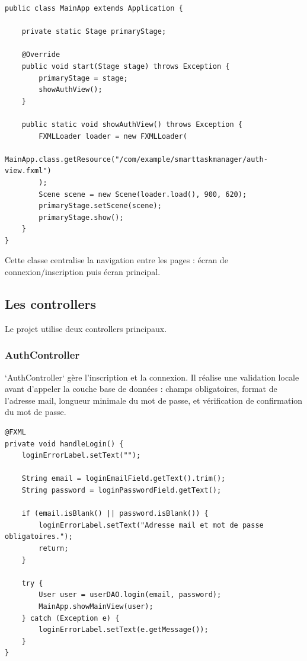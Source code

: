 \documentclass[11pt,a4paper]{article}
\begin{document}
\begin{lstlisting}[style=javaStyle,caption={Rôle principal de MainApp}]
public class MainApp extends Application {

    private static Stage primaryStage;

    @Override
    public void start(Stage stage) throws Exception {
        primaryStage = stage;
        showAuthView();
    }

    public static void showAuthView() throws Exception {
        FXMLLoader loader = new FXMLLoader(
                MainApp.class.getResource("/com/example/smarttaskmanager/auth-view.fxml")
        );
        Scene scene = new Scene(loader.load(), 900, 620);
        primaryStage.setScene(scene);
        primaryStage.show();
    }
}
\end{lstlisting}

Cette classe centralise la navigation entre les pages : écran de connexion/inscription puis écran principal.

\subsection{Les controllers}

Le projet utilise deux controllers principaux.

\subsubsection{AuthController}

`AuthController` gère l'inscription et la connexion. Il réalise une validation locale avant d'appeler la couche base de données : champs obligatoires, format de l'adresse mail, longueur minimale du mot de passe, et vérification de confirmation du mot de passe.

\begin{lstlisting}[style=javaStyle,caption={Validation et connexion dans AuthController}]
@FXML
private void handleLogin() {
    loginErrorLabel.setText("");

    String email = loginEmailField.getText().trim();
    String password = loginPasswordField.getText();

    if (email.isBlank() || password.isBlank()) {
        loginErrorLabel.setText("Adresse mail et mot de passe obligatoires.");
        return;
    }

    try {
        User user = userDAO.login(email, password);
        MainApp.showMainView(user);
    } catch (Exception e) {
        loginErrorLabel.setText(e.getMessage());
    }
}
\end{lstlisting}
\end{document}
